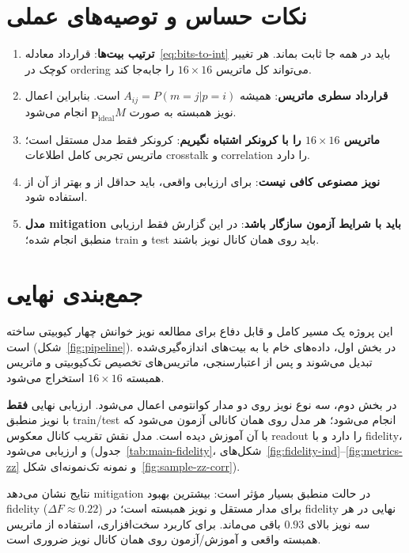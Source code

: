 \section{نکات حساس و توصیه‌های عملی}

\begin{enumerate}
	\item \textbf{ترتیب بیت‌ها}: قرارداد معادله~\eqref{eq:bits-to-int} باید در همه جا ثابت بماند. هر تغییر کوچک در ordering می‌تواند کل ماتریس $16\times16$ را جابه‌جا کند.
	\item \textbf{قرارداد سطری ماتریس}: همیشه $A_{ij}=P(m=j|p=i)$ است. بنابراین اعمال نویز همبسته به صورت $\mathbf{p}_{\mathrm{ideal}}M$ انجام می‌شود.
	\item \textbf{ماتریس $16\times16$ را با کرونکر اشتباه نگیریم}: کرونکر فقط مدل مستقل است؛ ماتریس تجربی کامل اطلاعات crosstalk و correlation را دارد.
	\item \textbf{نویز مصنوعی کافی نیست}: برای ارزیابی واقعی، باید حداقل از  و بهتر از آن از  استفاده شود.
	\item \textbf{مدل mitigation باید با شرایط آزمون سازگار باشد}: در این گزارش فقط ارزیابی منطبق انجام شده؛ train و test باید روی همان کانال نویز باشند.
\end{enumerate}

\section{جمع‌بندی نهایی}

این پروژه یک مسیر کامل و قابل دفاع برای مطالعه نویز خوانش چهار کیوبیتی ساخته است (شکل~\ref{fig:pipeline}). در بخش اول، داده‌های خام  با  به بیت‌های اندازه‌گیری‌شده تبدیل می‌شوند و پس از اعتبارسنجی، ماتریس‌های تخصیص تک‌کیوبیتی و ماتریس همبسته $16\times16$ استخراج می‌شود.

در بخش دوم، سه نوع نویز روی دو مدار کوانتومی اعمال می‌شود. ارزیابی نهایی \textbf{فقط} با نویز منطبق train/test انجام می‌شود؛ هر مدل روی همان کانالی آزمون می‌شود که با آن آموزش دیده است. مدل  نقش تقریب کانال معکوس readout را دارد و با fidelity،  و  ارزیابی می‌شود (جدول~\ref{tab:main-fidelity}، شکل‌های~\ref{fig:fidelity-ind}--\ref{fig:metrics-zz} و نمونه تک‌نمونه‌ای شکل~\ref{fig:sample-zz-corr}).

نتایج نشان می‌دهد mitigation در حالت منطبق بسیار مؤثر است: بیشترین بهبود fidelity ($\Delta F \approx 0.22$) برای مدار مستقل و نویز همبسته است؛ در  fidelity نهایی در هر سه نویز بالای $0.93$ باقی می‌ماند. برای کاربرد سخت‌افزاری، استفاده از ماتریس همبسته واقعی و آموزش/آزمون روی همان کانال نویز ضروری است.

